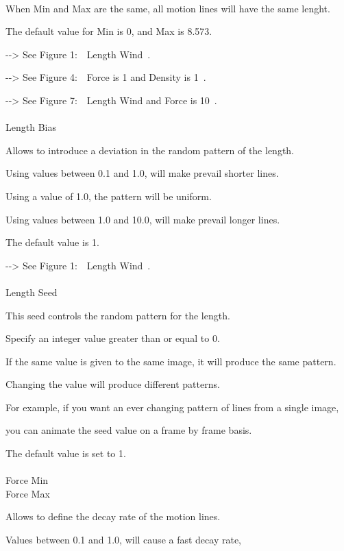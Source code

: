 \documentclass[a4paper,12pt]{article}
\begin{document}
\newpage

\thispagestyle{empty}

\ \vspace{-0.2em}
\par
When Min and Max are the same, all motion lines will have the same lenght.\par
The default value for Min is 0, and Max is 8.573.\par
-{-}> See \textquotedbl Figure 1:\ \ Length Wind\textquotedbl \ .\par
-{-}> See \textquotedbl Figure 4:\ \ Force is 1 and Density is 1\textquotedbl \ .\par
-{-}> See \textquotedbl Figure 7:\ \ Length Wind and Force is 10\textquotedbl \ .\\
\\
Length Bias\par
Allows to introduce a deviation in the random pattern of the length.\par
Using values between 0.1 and 1.0, will make prevail shorter lines.\par
Using a value of 1.0, the pattern will be uniform.\par
Using values between 1.0 and 10.0, will make prevail longer lines.\par
The default value is 1.\par
-{-}> See \textquotedbl Figure 1:\ \ Length Wind\textquotedbl \ .\\
\\
Length Seed\par
This seed controls the random pattern for the length.\par
Specify an integer value greater than or equal to 0.\par
If the same value is given to the same image, it will produce the same pattern.\par
Changing the value will produce different patterns.\par
For example, if you want an ever changing pattern of lines from a single image,\par
you can animate the seed value on a frame by frame basis.\par
The default value is set to 1.\\
\\
Force Min\\
Force Max\par
Allows to define the decay rate of the motion lines.\par
Values between 0.1 and 1.0, will cause a fast decay rate,\par
\end{document}
